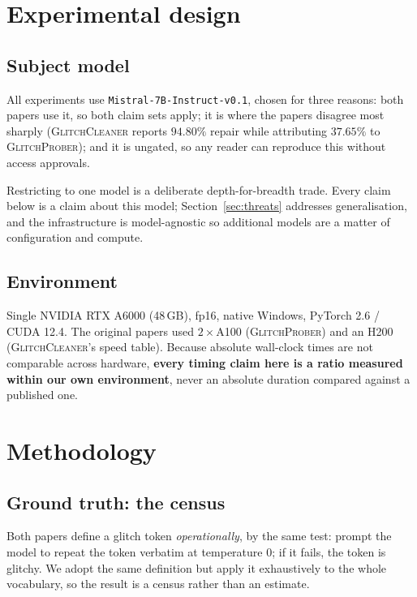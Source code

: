 \documentclass[11pt,a4paper]{article}
\newcommand{\gp}{\textsc{GlitchProber}}
\newcommand{\gc}{\textsc{GlitchCleaner}}
\begin{document}
\section{Experimental design}

\subsection{Subject model}

All experiments use \texttt{Mistral-7B-Instruct-v0.1}, chosen for three reasons:
both papers use it, so both claim sets apply; it is where the papers disagree most
sharply (\gc{} reports $94.80\%$ repair while attributing $37.65\%$ to \gp{}); and
it is ungated, so any reader can reproduce this without access approvals.

Restricting to one model is a deliberate depth-for-breadth trade. Every claim
below is a claim about this model; Section~\ref{sec:threats} addresses
generalisation, and the infrastructure is model-agnostic so additional models are
a matter of configuration and compute.

\subsection{Environment}

Single NVIDIA RTX A6000 (48\,GB), fp16, native Windows, PyTorch 2.6 / CUDA 12.4.
The original papers used $2\times$A100 (\gp{}) and an H200 (\gc{}'s speed table).
Because absolute wall-clock times are not comparable across hardware,
\textbf{every timing claim here is a ratio measured within our own environment},
never an absolute duration compared against a published one.

\section{Methodology}

\subsection{Ground truth: the census}
\label{sec:census-method}

Both papers define a glitch token \emph{operationally}, by the same test: prompt
the model to repeat the token verbatim at temperature $0$; if it fails, the token
is glitchy. We adopt the same definition but apply it exhaustively to the whole
vocabulary, so the result is a census rather than an estimate.
\end{document}

